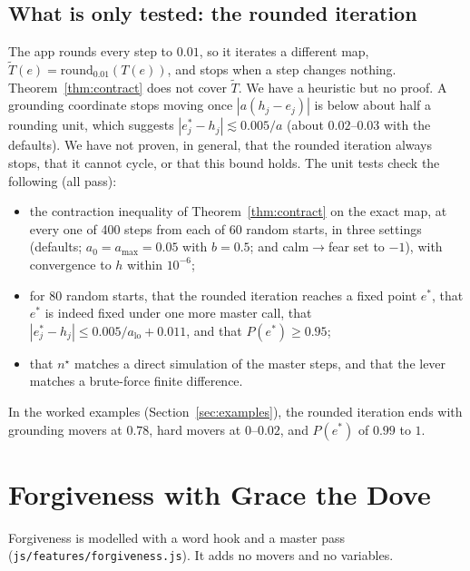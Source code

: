 \documentclass[10pt]{article}
\theoremstyle{definition}
\theoremstyle{remark}
\begin{document}
\subsection{What is only tested: the rounded iteration}
The app rounds every step to $0.01$, so it iterates a different map, $\tilde T(e)=\mathrm{round}_{0.01}(T(e))$, and stops when a step changes nothing. Theorem~\ref{thm:contract} does not cover $\tilde T$. We have a heuristic but no proof. A grounding coordinate stops moving once $|a(h_j-e_j)|$ is below about half a rounding unit, which suggests $|e^\ast_j-h_j|\lesssim0.005/a$ (about $0.02$--$0.03$ with the defaults). We have not proven, in general, that the rounded iteration always stops, that it cannot cycle, or that this bound holds. The unit tests check the following (all pass):
\begin{itemize}
\item the contraction inequality of Theorem~\ref{thm:contract} on the exact map, at every one of 400 steps from each of 60 random starts, in three settings (defaults; $a_0=a_{\max}=0.05$ with $b=0.5$; and calm$\to$fear set to $-1$), with convergence to $h$ within $10^{-6}$;
\item for 80 random starts, that the rounded iteration reaches a fixed point $e^\ast$, that $e^\ast$ is indeed fixed under one more master call, that $|e^\ast_j-h_j|\le 0.005/a_{\mathrm{lo}}+0.011$, and that $P(e^\ast)\ge0.95$;
\item that $n^\star$ matches a direct simulation of the master steps, and that the lever matches a brute-force finite difference.
\end{itemize}
In the worked examples (Section~\ref{sec:examples}), the rounded iteration ends with grounding movers at $0.78$, hard movers at $0$--$0.02$, and $P(e^\ast)$ of $0.99$ to $1$.

\section{Forgiveness with Grace the Dove}
\label{sec:forgive}
Forgiveness is modelled with a word hook and a master pass (\texttt{js/features/forgiveness.js}). It adds no movers and no variables.
\end{document}
